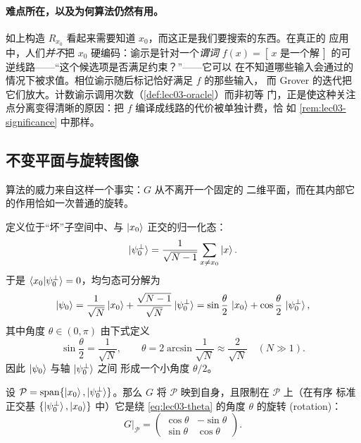 \paragraph{难点所在，以及为何算法仍然有用。}
如上构造 $R_{x_0}$ 看起来需要知道 $x_0$，而这正是我们要搜索的东西。在真正的
应用中，人们\emph{并不}把 $x_0$ 硬编码：谕示是针对一个\emph{谓词}
$f(x)=[\,x\text{ 是一个解}\,]$ 的可逆线路——“这个候选项是否满足约束？”——它可以
在不知道哪些输入会通过的情况下被求值。相位谕示随后标记恰好满足 $f$ 的那些输入，
而 Grover 的迭代把它们放大。计数谕示调用次数（\cref{def:lec03-oracle}）而非初等
门，正是使这种关注点分离变得清晰的原因：把 $f$ 编译成线路的代价被单独计费，恰
如 \cref{rem:lec03-significance} 中那样。
\subsection{不变平面与旋转图像}

算法的威力来自这样一个事实：$G$ 从不离开一个固定的
二维平面，而在其内部它的作用恰如一次普通的旋转。

定义位于“坏”子空间中、与 $\ket{x_0}$ 正交的归一化态：
\[
  \ket{\psi_0^{\perp}}
    =\frac{1}{\sqrt{N-1}}\sum_{x\neq x_0}\ket{x}.
\]
于是 $\braket{x_0|\psi_0^{\perp}}=0$，均匀态可分解为
\begin{equation}
  \ket{\psi_0}
    =\frac{1}{\sqrt N}\ket{x_0}+\frac{\sqrt{N-1}}{\sqrt N}\ket{\psi_0^{\perp}}
    =\sin\frac{\theta}{2}\,\ket{x_0}+\cos\frac{\theta}{2}\,\ket{\psi_0^{\perp}},
  \label{eq:lec03-initdecomp}
\end{equation}
其中角度 $\theta\in(0,\pi)$ 由下式定义
\begin{equation}
  \sin\frac{\theta}{2}=\frac{1}{\sqrt N},
  \qquad
  \theta=2\arcsin\frac{1}{\sqrt N}\approx\frac{2}{\sqrt N}\quad(N\gg1).
  \label{eq:lec03-theta}
\end{equation}
因此 $\ket{\psi_0}$ 与轴 $\ket{\psi_0^{\perp}}$ 之间
形成一个小角度 $\theta/2$。

\begin{theorem}
\label{thm:lec03-rotation}
设 $\mathcal{P}=\operatorname{span}\{\ket{x_0},\ket{\psi_0^{\perp}}\}$。那么 $G$
将 $\mathcal{P}$ 映到自身，且限制在 $\mathcal{P}$ 上（在有序
标准正交基 $\{\ket{\psi_0^{\perp}},\ket{x_0}\}$ 中）它是绕
\eqref{eq:lec03-theta} 的角度 $\theta$ 的旋转 (rotation)：
\[
  G\big|_{\mathcal{P}}
    =\begin{pmatrix}\cos\theta & -\sin\theta\\[2pt]\sin\theta & \cos\theta\end{pmatrix}.
\]
\end{theorem}

